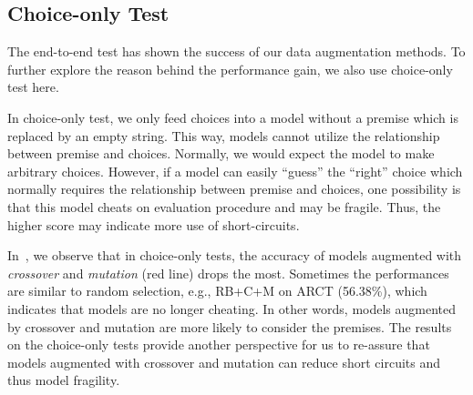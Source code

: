 


\subsection{Choice-only Test}
\label{sec:choice-only}

The end-to-end test has shown the success of our data augmentation 
methods. To further explore the reason behind the performance gain, 
we also use choice-only test here.

In choice-only test, we only feed choices into a model without a premise which is replaced 
by an empty string. This way, 
models cannot utilize the relationship between premise and choices. 
Normally, we would expect the model to make arbitrary choices.
However, if a model can easily ``guess'' the ``right'' choice which 
normally requires the relationship between premise and choices,  
one possibility is that this model cheats on evaluation procedure and 
may be fragile. Thus, the higher score may indicate more use of short-circuits.

In~, we observe that in choice-only tests,
the accuracy of models augmented with \textit{crossover} and \textit{mutation} 
(red line) drops the most. 
Sometimes the performances are similar to random selection, e.g., 
RB+C+M on ARCT (56.38\%), which indicates that models 
are no longer cheating. 
In other words, models augmented by crossover and mutation 
are more likely to consider the premises. 
The results on the choice-only tests provide another perspective for us
to re-assure that models augmented with crossover and mutation can reduce
short circuits and thus model fragility.

